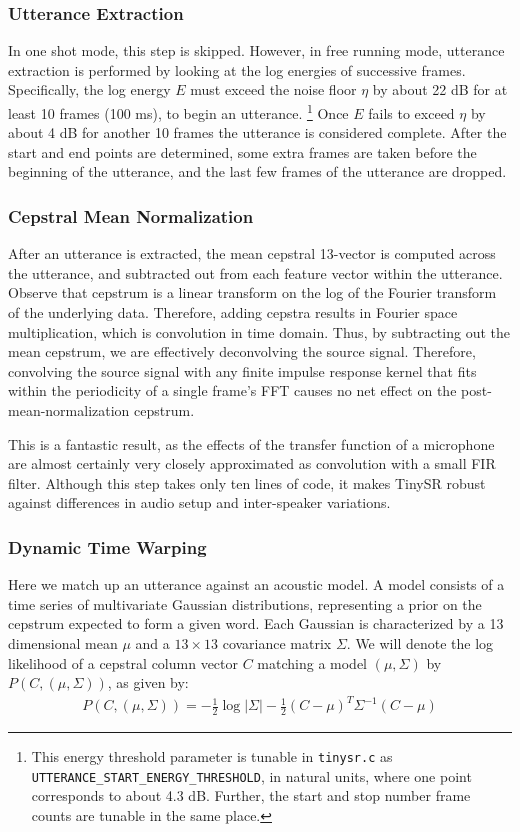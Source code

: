 \documentclass{article}
\begin{document}
\subsubsection{Utterance Extraction}
In one shot mode, this step is skipped.
However, in free running mode, utterance extraction is performed by looking at the log energies of successive frames.
Specifically, the log energy $E$ must exceed the noise floor $\eta$ by about 22 dB for at least 10 frames (100 ms), to begin an utterance.%
\footnote{This energy threshold parameter is tunable in \texttt{tinysr.c} as \texttt{UTTERANCE\_START\_ENERGY\_THRESHOLD}, in natural units, where one point corresponds to about 4.3 dB. Further, the start and stop number frame counts are tunable in the same place.}
Once $E$ fails to exceed $\eta$ by about 4 dB for another 10 frames the utterance is considered complete.
After the start and end points are determined, some extra frames are taken before the beginning of the utterance, and the last few frames of the utterance are dropped.

\subsubsection{Cepstral Mean Normalization}
After an utterance is extracted, the mean cepstral 13-vector is computed across the utterance, and subtracted out from each feature vector within the utterance.
Observe that cepstrum is a linear transform on the log of the Fourier transform of the underlying data.
Therefore, adding cepstra results in Fourier space multiplication, which is convolution in time domain.
Thus, by subtracting out the mean cepstrum, we are effectively deconvolving the source signal.
Therefore, convolving the source signal with any finite impulse response kernel that fits within the periodicity of a single frame's FFT causes no net effect on the post-mean-normalization cepstrum.

This is a fantastic result, as the effects of the transfer function of a microphone are almost certainly very closely approximated as convolution with a small FIR filter.
Although this step takes only ten lines of code, it makes TinySR robust against differences in audio setup and inter-speaker variations.

\subsubsection{Dynamic Time Warping}
Here we match up an utterance against an acoustic model.
A model consists of a time series of multivariate Gaussian distributions, representing a prior on the cepstrum expected to form a given word.
Each Gaussian is characterized by a 13 dimensional mean $\mu$ and a $13\times13$ covariance matrix $\Sigma$.
We will denote the log likelihood of a cepstral column vector $C$ matching a model $(\mu, \Sigma)$ by $P\left(C, (\mu, \Sigma)\right)$, as given by:
\begin{align*}
P\left(C, (\mu, \Sigma)\right) = - \frac12 \log | \Sigma | - \frac12 (C - \mu)^T \Sigma^{-1} (C - \mu)
\end{align*}
\end{document}
